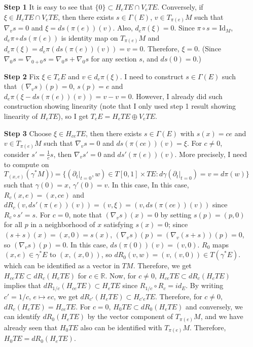 \documentclass[a4paper, 12pt]{article}
\theoremstyle{Mydefinition}
\theoremstyle{Mytheorem}
\begin{document}
\begin{enumerate}
    \item[\textbf{Step 1}] It is easy to see that $\{0\}\subset H_eTE\cap V_eTE$. Conversely, if $\xi\in H_eTE\cap V_eTE$, then there exists $s\in \Gamma(E)$, $v\in T_{\pi(e)}M$ such that $\nabla_v s = 0$ and $\xi = ds(\pi(e))(v)$. Also, $d_e\pi(\xi)=0$. Since $\pi\circ s = \textrm{Id}_M$, $d_e\pi \circ ds(\pi(e))$ is identity map on $T_{\pi(e)} M$ and $d_e\pi(\xi) = d_e\pi(ds(\pi(e))(v)) = v = 0$. Therefore, $\xi = 0$. (Since $\nabla_0 s = \nabla_{0+0} s = \nabla_0 s + \nabla_0 s$ for any section $s$, and $ds(0) = 0$.)
    
    \item[\textbf{Step 2}] Fix $\xi\in T_e E$ and $v\in d_e\pi(\xi)$. I need to construct $s\in \Gamma(E)$ such that $(\nabla_v s)(p) = 0$, $s(p) = e$ and $d_e \pi(\xi-ds(\pi(e))(v)) = v - v = 0$. However, I already did such construction showing linearity (note that I only used step 1 result showing linearity of $H_eTE$), so I get $T_eE = H_eTE\oplus V_eTE$.

    \item[\textbf{Step 3}] Choose $\xi\in H_{ce}TE$, then there exists $s\in\Gamma(E)$ with $s(x) = ce$ and $v\in T_{\pi(e)}M$ such that $\nabla_v s = 0$ and $ds(\pi(ce))(v) = \xi$. For $c\neq 0$, consider $s' = \frac{1}{c}s$, then $\nabla_v s' = 0$ and $ds'(\pi(e))(v)$. More precisely, I need to compute on $T_{(x,e)}(\gamma^* M)) = \{(\partial_t|_{t=0}, w)\in T[0,1]\times TE:d\gamma(\partial_t|_{t=0}) = v = d\pi(w)\}$ such that $\gamma(0) = x$, $\gamma'(0) = v$. In this case, In this case, $R_c(x,e) = (x,ce)$ and $dR_c(v, ds'(\pi(e))(v)) = (v,\xi) = (v, ds(\pi(ce))(v))$ since $R_c\circ s' = s$. For $c=0$, note that $(\nabla_v s)(x) = 0$ by setting $s(p) = (p, 0)$ for all $p$ in a neighborhood of $x$ satisfying $s(x) = 0$; since $(s+s)(x) = (x,0) = s(x)$, $(\nabla_v s)(p) = (\nabla_v (s+s))(p) = 0$, so $(\nabla_v s)(p) = 0$. In this case, $ds(\pi(0))(v) = (v,0)$. $R_0$ maps $(x,e)\in \gamma^*E$ to $(x, (x, 0))$, so $dR_0(v,w) = (v, (v, 0))\in T(\gamma^*E)$. which can be identified as a vector in $TM$. Therefore, we get $H_{ce}TE\subset dR_c(H_eTE)$ for $c\in \mathbb{R}$.
    Now, for $c\neq 0$, $H_{ce}TE\subset dR_c (H_e TE)$ implies that $dR_{1/c}(H_{ce}TE) \subset H_eTE$ since $R_{1/c}\circ R_c = id_E$. By writing $c'=1/c$, $e\mapsto ec$, we get $dR_{c'}(H_eTE)\subset H_{c'e}TE$. Therefore, for $c\neq 0$, $dR_c(H_eTE) = H_{ce}TE$. For $c=0$, $H_0TE\subset dR_0 (H_eTE)$ and conversely, we can identify $dR_0 (H_eTE)$ by the vector component of $T_{\pi(e)}M$, and we have already seen that $H_0TE$ also can be identified with $T_{\pi(e)}M$. Therefore, $H_0TE = dR_0(H_eTE)$.
\end{enumerate}
\end{document}
